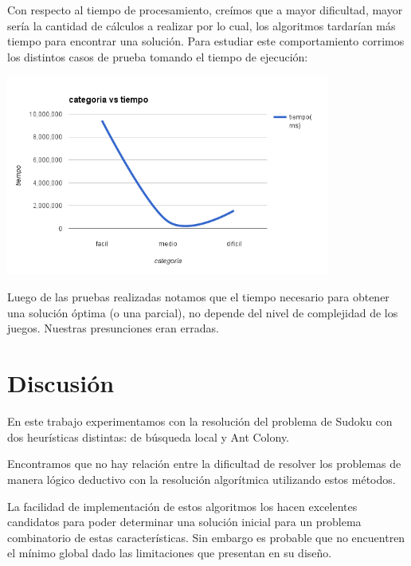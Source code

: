 \documentclass[a4paper,spanish]{article}
\begin{document}
Con respecto al tiempo de procesamiento, creímos que a mayor dificultad, mayor sería la
cantidad de cálculos a realizar por lo cual, los algoritmos tardarían más tiempo para encontrar
una solución. Para estudiar este comportamiento corrimos los distintos casos de prueba tomando
el tiempo de ejecución:

\begin{center}
	\includegraphics[width=0.8\textwidth]{./graficos/categoriaVsTiempo.png}
\end{center}

Luego de las pruebas realizadas notamos que el tiempo necesario para obtener una solución
óptima (o una parcial), no depende del nivel de complejidad de los juegos.
Nuestras presunciones eran erradas.


\section{Discusión}

En este trabajo experimentamos con la resolución del problema de Sudoku con dos
heurísticas distintas: de búsqueda local y Ant Colony.


Encontramos que no hay relación entre la dificultad de resolver los problemas de
manera lógico deductivo con la resolución algorítmica utilizando estos métodos.

La facilidad de implementación de estos algoritmos los hacen excelentes
candidatos para poder determinar una solución inicial para un problema
combinatorio de estas características. Sin embargo es probable que no encuentren
el mínimo global dado las limitaciones que presentan en su diseño.

\clearpage


\end{document}

